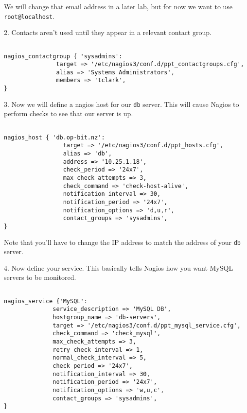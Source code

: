\documentclass{article}         %
\begin{document}
We will change that email address in a later lab, but for now we want to use
\texttt{root@localhost}.

2. Contacts aren't used until they appear in a relevant contact group.

\begin{verbatim}

nagios_contactgroup { 'sysadmins':
               target => '/etc/nagios3/conf.d/ppt_contactgroups.cfg',
               alias => 'Systems Administrators',
               members => 'tclark', 
}

  \end{verbatim}



3. Now we will define a nagios host for our \texttt{db} server.
This will cause Nagios to perform checks to see that our server
is up.

\begin{verbatim}

nagios_host { 'db.op-bit.nz':
                 target => '/etc/nagios3/conf.d/ppt_hosts.cfg',
                 alias => 'db',
                 address => '10.25.1.18',
                 check_period => '24x7',
                 max_check_attempts => 3,
                 check_command => 'check-host-alive',
                 notification_interval => 30,
                 notification_period => '24x7',
                 notification_options => 'd,u,r',
                 contact_groups => 'sysadmins',
}
\end{verbatim}


Note that you'll have to change the IP address to match the address of
your \texttt{db} server.

4. Now define your service.  This basically tells Nagios
how you want MySQL servers to be monitored.

\begin{verbatim}

nagios_service {'MySQL':
              service_description => 'MySQL DB',
              hostgroup_name => 'db-servers',
              target => '/etc/nagios3/conf.d/ppt_mysql_service.cfg',
              check_command => 'check_mysql',
              max_check_attempts => 3,
              retry_check_interval => 1,
              normal_check_interval => 5,
              check_period => '24x7',
              notification_interval => 30,
              notification_period => '24x7',
              notification_options => 'w,u,c',
              contact_groups => 'sysadmins',
}
\end{verbatim}
\end{document}

